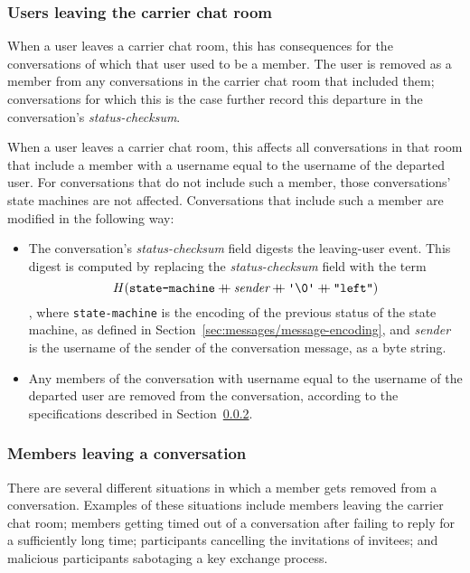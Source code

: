 \documentclass{article}
\def\field#1{\textit{#1}}
\def\smfield#1{\textsl{#1}}
\def\concat{\mathbin{+\!\!\!+}}
\begin{document}
\subsubsection{Users leaving the carrier chat room}
\label{sec:conversation-state-machine/operations/leaving}

When a user leaves a carrier chat room, this has consequences for the conversations of which that user used to be a member.
The user is removed as a member from any conversations in the carrier chat room that included them; conversations for which this is the case further record this departure in the conversation's \smfield{status-checksum}.

When a user leaves a carrier chat room, this affects all conversations in that room that include a member with a username equal to the username of the departed user.
For conversations that do not include such a member, those conversations' state machines are not affected.
Conversations that include such a member are modified in the following way:
\begin{itemize}
\item The conversation's \smfield{status-checksum} field digests the leaving-user event. This digest is computed by replacing the \smfield{status-checksum} field with the term
$$H(\texttt{state-machine} \concat \field{sender} \concat \texttt{\textquotesingle \char`\\ 0\textquotesingle} \concat \texttt{"{}left"{}})$$
, where \texttt{state-machine} is the encoding of the previous status of the state machine, as defined in Section~\ref{sec:messages/message-encoding}, and \field{sender} is the username of the sender of the conversation message, as a byte string.
\item Any members of the conversation with username equal to the username of the departed user are removed from the conversation, according to the specifications described in Section~\ref{sec:conversation-state-machine/operations/removing}.
\end{itemize}


\subsubsection{Members leaving a conversation}
\label{sec:conversation-state-machine/operations/removing}

There are several different situations in which a member gets removed from a conversation.
Examples of these situations include members leaving the carrier chat room; members getting timed out of a conversation after failing to reply for a sufficiently long time; participants cancelling the invitations of invitees; and malicious participants sabotaging a key exchange process.
\end{document}
